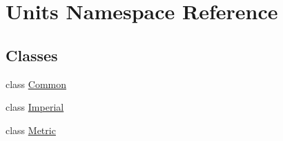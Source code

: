 \hypertarget{namespace_units}{\section{Units Namespace Reference}
\label{namespace_units}
}
\subsection*{Classes}
\begin{DoxyCompactItemize}
\item 
class \hyperlink{class_units_1_1_common}{Common}
\item 
class \hyperlink{class_units_1_1_imperial}{Imperial}
\item 
class \hyperlink{class_units_1_1_metric}{Metric}
\end{DoxyCompactItemize}
